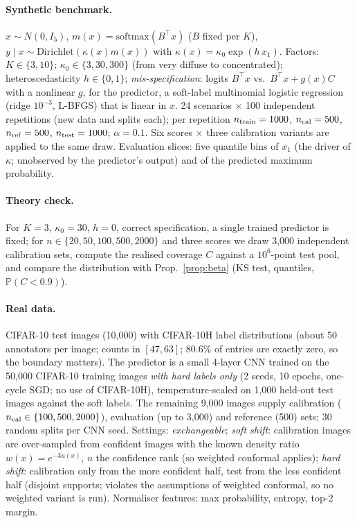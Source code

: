 \paragraph{Synthetic benchmark.} $x\sim N(0,I_5)$, $m(x)=\mathrm{softmax}(B^\top x)$ ($B$ fixed per $K$), $y\mid x\sim\mathrm{Dirichlet}(\kappa(x)m(x))$ with $\kappa(x)=\kappa_0\exp(h\,x_1)$. Factors: $K\in\{3,10\}$; $\kappa_0\in\{3,30,300\}$ (from very diffuse to concentrated); heteroscedasticity $h\in\{0,1\}$; \emph{mis-specification}: logits $B^\top x$ vs.\ $B^\top x+g(x)C$ with a nonlinear $g$, for the predictor, a soft-label multinomial logistic regression (ridge $10^{-3}$, L-BFGS) that is linear in $x$. 24 scenarios $\times$ 100 independent repetitions (new data and splits each); per repetition $n_{\rm train}=1000$, $n_{\rm cal}=500$, $n_{\rm ref}=500$, $n_{\rm test}=1000$; $\alpha=0.1$. Six scores $\times$ three calibration variants are applied to the same draw. Evaluation slices: five quantile bins of $x_1$ (the driver of $\kappa$; unobserved by the predictor's output) and of the predicted maximum probability.
\paragraph{Theory check.} For $K=3$, $\kappa_0=30$, $h=0$, correct specification, a single trained predictor is fixed; for $n\in\{20,50,100,500,2000\}$ and three scores we draw 3,000 independent calibration sets, compute the realised coverage $C$ against a $10^6$-point test pool, and compare the distribution with Prop.~\ref{prop:beta} (KS test, quantiles, $\mathbb P(C<0.9)$).
\paragraph{Real data.} CIFAR-10 test images (10,000) with CIFAR-10H label distributions \citep{peterson2019human} (about 50 annotators per image; counts in $[47,63]$; 80.6\% of entries are exactly zero, so the boundary matters). The predictor is a small 4-layer CNN trained on the 50,000 CIFAR-10 training images \emph{with hard labels only} (2 seeds, 10 epochs, one-cycle SGD; no use of CIFAR-10H), temperature-scaled on 1,000 held-out test images against the soft labels. The remaining 9,000 images supply calibration ($n_{\rm cal}\in\{100,500,2000\}$), evaluation (up to 3,000) and reference (500) sets; 30 random splits per CNN seed. Settings: \emph{exchangeable}; \emph{soft shift}: calibration images are over-sampled from confident images with the known density ratio $w(x)=e^{-3u(x)}$, $u$ the confidence rank (so weighted conformal applies); \emph{hard shift}: calibration only from the more confident half, test from the less confident half (disjoint supports; violates the assumptions of weighted conformal, so no weighted variant is run). Normaliser features: max probability, entropy, top-2 margin.
